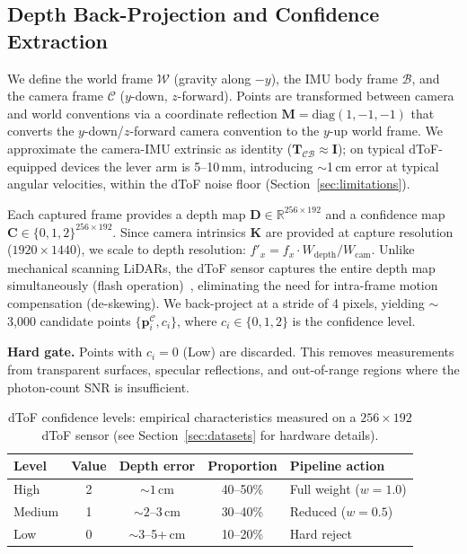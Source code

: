\documentclass[journal]{IEEEtran}
\begin{document}
\subsection{Depth Back-Projection and Confidence Extraction}
\label{sec:backproj}

We define the world frame $\mathcal{W}$ (gravity along $-y$), the IMU body frame $\mathcal{B}$, and the camera frame $\mathcal{C}$ ($y$-down, $z$-forward). Points are transformed between camera and world conventions via a coordinate reflection $\mathbf{M} = \text{diag}(1,-1,-1)$ that converts the $y$-down/$z$-forward camera convention to the $y$-up world frame. We approximate the camera-IMU extrinsic as identity ($\mathbf{T}_{\mathcal{C}\mathcal{B}} \approx \mathbf{I}$); on typical dToF-equipped devices the lever arm is 5--10\,mm, introducing ${\sim}$1\,cm error at typical angular velocities, within the dToF noise floor (Section~\ref{sec:limitations}).

Each captured frame provides a depth map $\mathbf{D} \in \mathbb{R}^{256 \times 192}$ and a confidence map $\mathbf{C} \in \{0, 1, 2\}^{256 \times 192}$. Since camera intrinsics $\mathbf{K}$ are provided at capture resolution ($1920 \times 1440$), we scale to depth resolution: $f'_x = f_x \cdot W_{\text{depth}} / W_{\text{cam}}$. Unlike mechanical scanning LiDARs, the dToF sensor captures the entire depth map simultaneously (flash operation)~\cite{luetzenburg2021evaluation}, eliminating the need for intra-frame motion compensation (de-skewing). We back-project at a stride of 4 pixels, yielding ${\sim}$3{,}000 candidate points $\{\mathbf{p}_i^{\mathcal{C}}, c_i\}$, where $c_i \in \{0,1,2\}$ is the confidence level.

\textbf{Hard gate.} Points with $c_i = 0$ (Low) are discarded. This removes measurements from transparent surfaces, specular reflections, and out-of-range regions where the photon-count SNR is insufficient.

\begin{table}[t]
    \centering
    \caption{dToF confidence levels: empirical characteristics measured on a $256 \times 192$ dToF sensor (see Section~\ref{sec:datasets} for hardware details).}
    \label{tab:confidence_levels}
    \setlength{\tabcolsep}{3pt}
    \footnotesize
    \begin{tabular}{lcccl}
        \toprule
        Level & Value & Depth error & Proportion & Pipeline action \\
        \midrule
        High & 2 & ${\sim}1$\,cm & 40--50\% & Full weight ($w = 1.0$) \\
        Medium & 1 & ${\sim}2$--3\,cm & 30--40\% & Reduced ($w = 0.5$) \\
        Low & 0 & ${\sim}3$--5+\,cm & 10--20\% & Hard reject \\
        \bottomrule
    \end{tabular}
\end{table}
\end{document}
